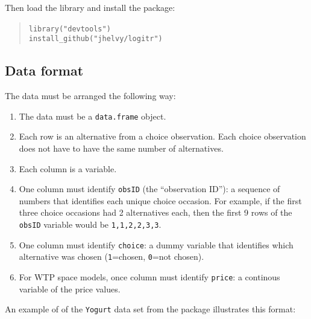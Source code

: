 \documentclass[article]{jss}
\providecommand{\tightlist}{%
  \setlength{\itemsep}{0pt}\setlength{\parskip}{0pt}}
\begin{document}
Then load the  library and install the 
package:

\begin{quote}
\texttt{library("devtools")}~\\
\texttt{install\_github("jhelvy/logitr")}
\end{quote}

\hypertarget{data-format}{%
\subsection{Data format}\label{data-format}}

The data must be arranged the following way:

\begin{enumerate}
\def\labelenumi{\arabic{enumi}.}
\tightlist
\item
  The data must be a \texttt{data.frame} object.
\item
  Each row is an alternative from a choice observation. Each choice
  observation does not have to have the same number of alternatives.
\item
  Each column is a variable.
\item
  One column must identify \texttt{obsID} (the ``observation ID''): a
  sequence of numbers that identifies each unique choice occasion. For
  example, if the first three choice occasions had 2 alternatives each,
  then the first 9 rows of the \texttt{obsID} variable would be
  \texttt{1,1,2,2,3,3}.
\item
  One column must identify \texttt{choice}: a dummy variable that
  identifies which alternative was chosen (\texttt{1}=chosen,
  \texttt{0}=not chosen).
\item
  For WTP space models, once column must identify \texttt{price}: a
  continous variable of the price values.
\end{enumerate}

An example of of the \texttt{Yogurt} data set from the 
package illustrates this format:
\end{document}
